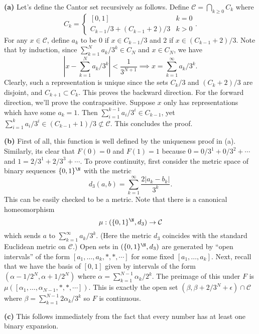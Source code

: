\documentclass[11pt,letterpaper]{article}
\begin{document}
\begin{solution}
    \textbf{(a)} Let's define the Cantor set recursively as follows. Define $\mathcal{C} = \bigcap_{k\geq 0} C_k$ where
    \[
        C_k = \begin{cases}
            [0,1] & k = 0\\
            C_{k-1}/3 + (C_{k-1}+2)/3 & k > 0
        \end{cases}
    .\]
    For any $x\in \mathcal{C}$, define $a_k$ to be $0$ if $x\in C_{k-1} /3$ and $2$ if $x\in (C_{k-1}+2) /3$. Note that by induction, since $\sum^N_{k=1}a_k /3^k\in C_N$ and $x\in C_N$, we have  
    \[
        \left|x - \sum^N_{k=1}a_k /3^k\right| < \frac{1}{3^{N+1}} \implies x = \sum^\infty_{k=1}a_k /3^k
    .\] 
    Clearly, such a representation is unique since the sets $C_k/3$ and $(C_k+2) /3$ are disjoint, and $C_{k+1}\subset C_{k}$. This proves the backward direction. For the forward direction, we'll prove the contrapositive. Suppose $x$ only has representations which have some $a_k=1$. Then $\sum^{k-1}_{i=1}a_i /3^i \in C_{k-1}$, yet $\sum^k_{i=1}a_i /3^i \in (C_{k-1}+1) /3 \not\subset \mathcal{C}$. This concludes the proof.  

    \textbf{(b)} First of all, this function is well defined by the uniqueness proof in (a). Similarly, its clear that $F(0)=0$ and $F(1)=1$ because $0 = 0 / 3^1 + 0 / 3^2 +\cdots$ and $1 = 2 / 3^1 + 2 / 3^3 + \cdots$. To prove continuity, first consider the metric space of binary sequences $\{0,1\}^\N$ with the metric 
    \[
        d_3(a,b) = \sum^\infty_{k=1}\frac{2|a_k - b_k|}{3^k}
    .\] 
    This can be easily checked to be a metric. Note that there is a canonical homeomorphism
    \[
        \mu : (\{0,1\}^\N, d_3) \to \mathcal{C}
    \]
    which sends $a$ to $\sum^\infty_{k=1}a_k /3^k$. (Here the metric $d_3$ coincides with the standard Euclidean metric on $\mathcal{C}$.) Open sets in $(\{0,1\}^\N, d_3)$ are generated by ``open intervals'' of the form $[a_1,\ldots,a_k, *, *, \cdots]$ for some fixed $[a_1,\ldots,a_k]$. Next, recall that we have the basis of $[0,1]$ given by intervals of the form $(\alpha-1 /2^N, \alpha+1 /2^N)$ where $\alpha=\sum^{N-1}_{k=1}\alpha_k /2^k$. The preimage of this under $F$ is $\mu([\alpha_1,\ldots,\alpha_{N-1},*, *, \cdots])$. This is exactly the open set $(\beta, \beta+2 / 3^N+\epsilon)\cap \mathcal{C}$ where $\beta=\sum^{N-1}_{k=1}2\alpha_k /3^k$ so $F$ is continuous.

    \textbf{(c)} This follows immediately from the fact that every number has at least one binary expansion.


\end{solution}
\end{document}
